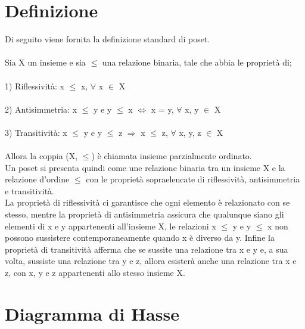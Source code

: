 \documentclass[a4paper,12pt, openright]{report}
\begin{document}
\section{Definizione}

Di seguito viene fornita la definizione standard di poset. \\
\\
Sia X un insieme e sia $\leq$ una relazione binaria, tale che abbia le proprietà di;\\
\\
1) Riflessività: x $\leq$ x, $\forall$ x $\in$ X\\
\\
2) Antisimmetria: x $\leq$ y e y $\leq$ x $\Leftrightarrow$ x = y, $\forall$ x, y $\in$ X \\
\\
3) Transitività: x $\leq$ y e y $\leq$ z $\Rightarrow$ x $\leq$ z, $\forall$ x, y, z $\in$ X\\
\\
Allora la coppia (X, $\leq$) è chiamata insieme parzialmente ordinato. \\
Un poset si presenta quindi come une relazione binaria tra un insieme X e la relazione d'ordine 
$\leq$  con le proprietà sopraelencate di riflessività, antisimmetria e transitività.\\
La proprietà di riflessività ci garantisce che ogni elemento è relazionato con se stesso, 
mentre la proprietà di antisimmetria assicura che qualunque siano gli elementi di x e y 
appartenenti all'insieme X, le relazioni  x $\leq$ y e y $\leq$ x non possono sussistere 
contemporaneamente quando x è diverso da y. Infine la proprietà di transitività afferma che 
se sussite una relazione tra x e y e, a sua volta, sussiste una relazione tra y e z, allora 
esisterà anche una relazione tra x e z, con x, y e z appartenenti allo stesso insieme X. 



\section{Diagramma di Hasse}
\end{document}
